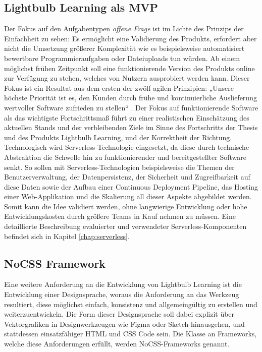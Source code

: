 \subsection{Lightbulb Learning als MVP}
Der Fokus auf den Aufgabentypen \emph{offene Frage} ist im Lichte des Prinzips der Einfachheit zu sehen: Es ermöglicht eine Validierung des Produkts, erfordert aber nicht die Umsetzung größerer Komplexität wie es beispielsweise automatisiert bewertbare Programmieraufgaben oder Dateiuploads tun würden. Ab einem möglichst frühen Zeitpunkt soll eine funktionierende Version des Produkts online zur Verfügung zu stehen, welches von Nutzern ausprobiert werden kann. Dieser Fokus ist ein Resultat aus dem ersten der zwölf agilen Prinzipien: „Unsere höchste Priorität ist es, den Kunden durch frühe und kontinuierliche Auslieferung wertvoller Software zufrieden zu stellen“ \cite[1. Prinzip]{beck2001}. Der Fokus auf funktionierende Software als das wichtigste Fortschrittsmaß führt zu einer realistischen Einschätzung des aktuellen Stands und der verbleibenden Ziele im Sinne des Fortschritts der Thesis und des Produkts Lightbulb Learning, und der Korrektheit der Richtung. Technologisch wird Serverless-Technologie eingesetzt, da diese durch technische Abstraktion die Schwelle hin zu funktionierender und bereitgestellter Software senkt. So sollen mit Serverless-Technologien beispielsweise die Themen der Benutzerverwaltung, der Datenpersistenz, der Sicherheit und Zugreifbarkeit auf diese Daten sowie der Aufbau einer Continuous Deployment Pipeline, das Hosting einer Web-Applikation und die Skalierung all dieser Aspekte abgebildet werden. Somit kann die Idee validiert werden, ohne langwierige Entwicklung oder hohe Entwicklungskosten durch größere Teams in Kauf nehmen zu müssen. Eine detaillierte Beschreibung evaluierter und verwendeter Serverless-Komponenten befindet sich in Kapitel \ref{chap:serverless}.

\subsection{NoCSS Framework}
Eine weitere Anforderung an die Entwicklung von Lightbulb Learning ist die Entwicklung einer Designsprache, woraus die Anforderung an das Werkzeug resultiert, diese möglichst einfach, konsistenz und allgemeingültig zu erstellen und weiterzuentwickeln. Die Form dieser Designsprache soll dabei explizit über Vektorgrafiken in Designwerkzeugen wie Figma oder Sketch hinausgehen, und stattdessen einsatzfähiger HTML und CSS Code sein. Die Klasse an Frameworks, welche diese Anforderungen erfüllt, werden NoCSS-Frameworks genannt.
